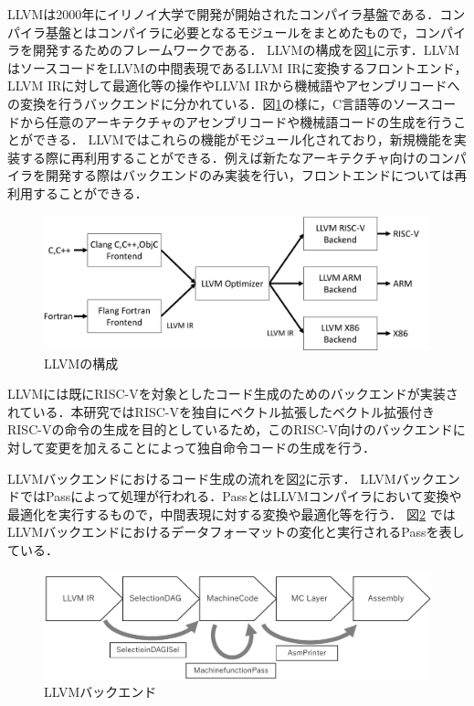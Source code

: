 LLVMは2000年にイリノイ大学で開発が開始されたコンパイラ基盤である．コンパイラ基盤とはコンパイラに必要となるモジュールをまとめたもので，コンパイラを開発するためのフレームワークである．
LLVMの構成を図\ref{fig:LLVM}に示す．LLVMはソースコードをLLVMの中間表現であるLLVM IRに変換するフロントエンド，LLVM IRに対して最適化等の操作やLLVM IRから機械語やアセンブリコードへの変換を行うバックエンドに分かれている．図\ref{fig:LLVM}の様に，C言語等のソースコードから任意のアーキテクチャのアセンブリコードや機械語コードの生成を行うことができる．
LLVMではこれらの機能がモジュール化されており，新規機能を実装する際に再利用することができる．例えば新たなアーキテクチャ向けのコンパイラを開発する際はバックエンドのみ実装を行い，フロントエンドについては再利用することができる．

\begin{figure}[b]
    \centering
    \includegraphics[scale=0.4]{image/LLVM.pdf}
    \caption{LLVMの構成}
    \label{fig:LLVM}
\end{figure}

LLVMには既にRISC-Vを対象としたコード生成のためのバックエンドが実装されている．本研究ではRISC-Vを独自にベクトル拡張したベクトル拡張付きRISC-Vの命令の生成を目的としているため，このRISC-V向けのバックエンドに対して変更を加えることによって独自命令コードの生成を行う．

LLVMバックエンドにおけるコード生成の流れを図\ref{fig:LLVM_backend}に示す．
LLVMバックエンドではPassによって処理が行われる．PassとはLLVMコンパイラにおいて変換や最適化を実行するもので，中間表現に対する変換や最適化等を行う．
図\ref{fig:LLVM_backend}
ではLLVMバックエンドにおけるデータフォーマットの変化と実行されるPassを表している．

\begin{figure}[tb]
    \centering
    \includegraphics[scale=0.7]{image/backend.pdf}
    \caption{LLVMバックエンド}
    \label{fig:LLVM_backend}
\end{figure}

